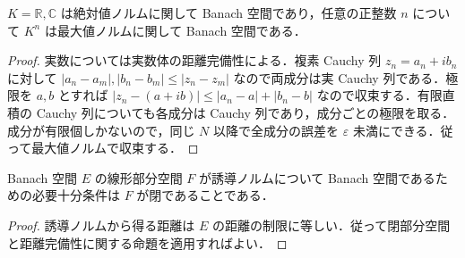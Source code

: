 \begin{prop}
$K=\mathbb R,\mathbb C$ は絶対値ノルムに関して Banach 空間であり，任意の正整数 $n$ について $K^n$ は最大値ノルムに関して Banach 空間である．
\end{prop}
\begin{proof}
実数については実数体の距離完備性による．複素 Cauchy 列 $z_n=a_n+ib_n$ に対して $|a_n-a_m|,|b_n-b_m|\leq |z_n-z_m|$ なので両成分は実 Cauchy 列である．極限を $a,b$ とすれば $|z_n-(a+ib)|\leq |a_n-a|+|b_n-b|$ なので収束する．有限直積の Cauchy 列についても各成分は Cauchy 列であり，成分ごとの極限を取る．成分が有限個しかないので，同じ $N$ 以降で全成分の誤差を $\varepsilon$ 未満にできる．従って最大値ノルムで収束する．
\end{proof}
\begin{prop}[閉部分空間のBanach性]
Banach 空間 $E$ の線形部分空間 $F$ が誘導ノルムについて Banach 空間であるための必要十分条件は $F$ が閉であることである．
\end{prop}
\begin{proof}
誘導ノルムから得る距離は $E$ の距離の制限に等しい．従って閉部分空間と距離完備性に関する命題を適用すればよい．
\end{proof}
